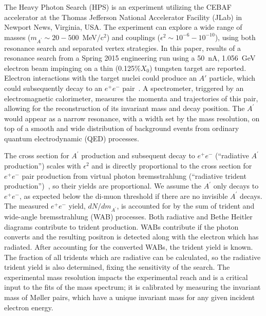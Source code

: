 \documentclass[twocolumn, showpacs, preprintnumbers,prd, superscriptaddress]{revtex4-1}
\newcommand{\mevcc}{MeV/c$^2$}
\newcommand{\pos}{e^{+}}
\newcommand{\ele}{e^{-}}
\newcommand{\epem}{\pos\ele}
\newcommand{\aprime}{A^\prime}
\begin{document}
        The Heavy Photon Search (HPS) is an experiment utilizing the CEBAF
        accelerator at the Thomas Jefferson National Accelerator Facility (JLab)
        in Newport News, Virginia, USA. The experiment can explore a wide range
        of masses ($m_{\aprime}\sim 20-500$~\mevcc) and couplings 
        ($\epsilon^2 \sim 10^{-6} - 10^{-10}$), using both resonance search and
        separated vertex strategies. In this paper, results of a 
        resonance search from a Spring 2015 engineering run  
        using a 50~nA, 1.056~GeV electron beam impinging on a
        thin (0.125\%$X_{0}$) tungsten target are reported.  Electron interactions 
        with the 
        target nuclei could produce an $A'$ particle, which could subsequently 
        decay to an $\epem$ 
        pair~\cite{Bjorken:2009mm,Reece:2009un,Freytsis:2009bh}. A spectrometer,
        triggered by an electromagnetic calorimeter, measures the momenta and
        trajectories of this pair, allowing for the reconstruction of its
        invariant mass and decay position. The $\aprime$ would appear as a 
        narrow resonance, with a width set by the mass resolution, on top of a 
        smooth and wide distribution of background events from ordinary
        quantum electrodynamic (QED) processes.

        The cross section for  $\aprime$ production and subsequent decay to $\epem$      
        (``radiative $\aprime$ production'') scales with $\epsilon^2$ and is 
        directly proportional to the cross section for $\epem$ pair production
        from virtual photon bremsstrahlung 
        (``radiative trident production'')~\cite{Bjorken:2009mm}, so their
        yields are proportional. We assume the
        $\aprime$ only decays to $\epem$, as expected below the di-muon threshold
        if there are no invisible $\aprime$ decays.
        The measured $\epem$ yield, $dN/dm_{\aprime}$, is accounted for by
        the sum of trident and wide-angle bremsstrahlung (WAB) processes. Both
        radiative and Bethe Heitler diagrams contribute to trident production.
        WABs contribute if the photon converts and the resulting positron is detected
        along with the electron which has radiated.
        After accounting for the converted WABs, the trident yield is known.
        The fraction
        of all tridents which are radiative can be calculated, so the radiative trident
        yield is also determined, fixing the sensitivity of the search. 
        The experimental mass resolution impacts the experimental reach and is a
        critical input to the fits of the mass spectrum; it is calibrated by 
        measuring the invariant mass of M\o ller pairs, which have a unique 
        invariant mass for any given incident electron energy.
\end{document}
